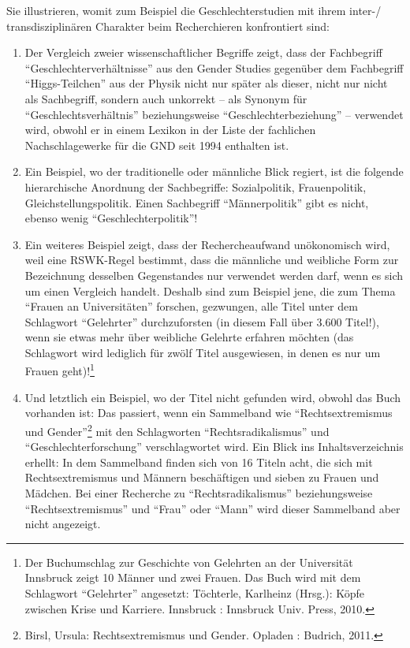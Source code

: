 Sie illustrieren, womit zum Beispiel die Geschlechterstudien mit ihrem
inter-/ transdisziplinären Charakter beim Recherchieren konfrontiert
sind:

\begin{enumerate}
\def\labelenumi{\arabic{enumi}.}
\item
  Der Vergleich zweier wissenschaftlicher Begriffe zeigt, dass der
  Fachbegriff \enquote{Geschlechterverhältnisse} aus den Gender Studies
  gegenüber dem Fachbegriff \enquote{Higgs-Teilchen} aus der Physik
  nicht nur später als dieser, nicht nur nicht als Sachbegriff, sondern
  auch unkorrekt -- als Synonym für \enquote{Geschlechtsverhältnis}
  beziehungsweise \enquote{Geschlechterbeziehung} -- verwendet wird,
  obwohl er in einem Lexikon in der Liste der fachlichen
  Nachschlagewerke für die GND seit 1994 enthalten ist.
\item
  Ein Beispiel, wo der traditionelle oder männliche Blick regiert, ist
  die folgende hierarchische Anordnung der Sachbegriffe: Sozialpolitik,
  Frauenpolitik, Gleichstellungspolitik. Einen Sachbegriff
  \enquote{Männerpolitik} gibt es nicht, ebenso wenig
  \enquote{Geschlechterpolitik}!
\item
  Ein weiteres Beispiel zeigt, dass der Rechercheaufwand unökonomisch
  wird, weil eine RSWK-Regel bestimmt, dass die männliche und weibliche
  Form zur Bezeichnung desselben Gegenstandes nur verwendet werden darf,
  wenn es sich um einen Vergleich handelt. Deshalb sind zum Beispiel
  jene, die zum Thema \enquote{Frauen an Universitäten} forschen,
  gezwungen, alle Titel unter dem Schlagwort \enquote{Gelehrter}
  durchzuforsten (in diesem Fall über 3.600 Titel!), wenn sie etwas mehr
  über weibliche Gelehrte erfahren möchten (das Schlagwort wird
  lediglich für zwölf Titel ausgewiesen, in denen es nur um Frauen
  geht)!\footnote{Der Buchumschlag zur Geschichte von Gelehrten an der
    Universität Innsbruck zeigt 10 Männer und zwei Frauen. Das Buch wird
    mit dem Schlagwort \enquote{Gelehrter} angesetzt: Töchterle,
    Karlheinz (Hrsg.): Köpfe zwischen Krise und Karriere. Innsbruck :
    Innsbruck Univ. Press, 2010.}
\item
  Und letztlich ein Beispiel, wo der Titel nicht gefunden wird, obwohl
  das Buch vorhanden ist: Das passiert, wenn ein Sammelband wie
  \enquote{Rechtsextremismus und Gender}\footnote{Birsl, Ursula:
    Rechtsextremismus und Gender. Opladen : Budrich, 2011.} mit den
  Schlagworten \enquote{Rechtsradikalismus} und
  \enquote{Geschlechterforschung} verschlagwortet wird. Ein Blick ins
  Inhaltsverzeichnis erhellt: In dem Sammelband finden sich von 16
  Titeln acht, die sich mit Rechtsextremismus und Männern beschäftigen
  und sieben zu Frauen und Mädchen. Bei einer Recherche zu
  \enquote{Rechtsradikalismus} beziehungsweise
  \enquote{Rechtsextremismus} und \enquote{Frau} oder \enquote{Mann}
  wird dieser Sammelband aber nicht angezeigt.
\end{enumerate}

